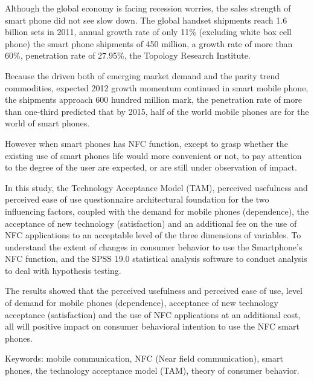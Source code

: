 Although the global economy is facing recession worries, the sales strength of smart phone did not see slow down. The global handset shipments reach 1.6 billion sets in 2011, annual growth rate of only 11\% (excluding white box cell phone) the smart phone shipments of 450 million, a growth rate of more than 60\%, penetration rate of 27.95\%, the Topology Research Institute. 
      
Because the driven both of emerging market demand and the parity trend commodities, expected 2012 growth momentum continued in smart mobile phone, the shipments approach 600 hundred million mark, the penetration rate of more than one-third predicted that by 2015, half of the world mobile phones are for the world of smart phones. 

However when smart phones has NFC function, except to grasp whether the existing use of smart phones life would more convenient or not, to pay attention to the degree of the user are expected, or are still under observation of impact. 

In this study, the Technology Acceptance Model (TAM), perceived usefulness and perceived ease of use questionnaire architectural foundation for the two influencing factors, coupled with the demand for mobile phones (dependence), the acceptance of new technology (satisfaction) and an additional fee on the use of NFC applications to an acceptable level of the three dimensions of variables. To understand the extent of changes in consumer behavior to use the Smartphone’s NFC function, and the SPSS 19.0 statistical analysis software to conduct analysis to deal with hypothesis testing. 

The results showed that the perceived usefulness and perceived ease of use, level of demand for mobile phones (dependence), acceptance of new technology acceptance (satisfaction) and the use of NFC applications at an additional cost, all will positive impact on consumer behavioral intention to use the NFC smart phones.

Keywords: mobile communication, NFC (Near field communication), smart phones, the technology acceptance model (TAM), theory of consumer behavior.
